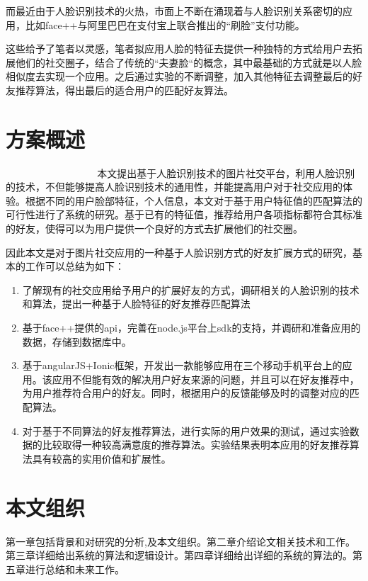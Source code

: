 而最近由于人脸识别技术的火热，市面上不断在涌现着与人脸识别关系密切的应用，比如face++与阿里巴巴在支付宝上联合推出的“刷脸”支付功能。

这些给予了笔者以灵感，笔者拟应用人脸的特征去提供一种独特的方式给用户去拓展他们的社交圈子，结合了传统的“夫妻脸“的概念，其中最基础的方式就是以人脸相似度去实现一个应用。之后通过实验的不断调整，加入其他特征去调整最后的好友推荐算法，得出最后的适合用户的匹配好友算法。
\section{方案概述}
􏰉􏴳􏰭􏴴􏴵􏴶􏴷􏰿􏴸􏴹􏴘􏰏􏲦􏲜􏱲􏴺􏰭􏴻􏲆􏴻􏴼􏰏􏱦􏴷􏱜􏰒􏴽􏳯􏴾􏴿􏵀􏱾􏱜本文提出基于人脸识别技术的图片社交平台，利用人脸识别的技术，不但能够提高人脸识别技术的通用性，并能提高用户对于社交应用的体验。根据不同的用户脸部特征，个人信息，本文对于基于用户特征值的匹配算法的可行性进行了系统的研究。基于已有的特征值，推荐给用户各项指标都符合其标准的好友，使得可以为用户提供一个良好的方式去扩展他们的社交圈。


因此本文是对于图片社交应用的一种基于人脸识别方式的好友扩展方式的研究，基本的工作可以总结为如下：
\begin{enumerate}
\item 了解现有的社交应用给予用户的扩展好友的方式，调研相关的人脸识别的技术和算法，提出一种基于人脸特征的好友推荐匹配算法
\item 基于face++提供的api，完善在node.js平台上sdk的支持，并调研和准备应用的数据，存储到数据库中。
\item 基于angularJS+Ionic框架，开发出一款能够应用在三个移动手机平台上的应用。该应用不但能有效的解决用户好友来源的问题，并且可以在好友推荐中，为用户推荐符合用户的好友。同时，根据用户的反馈能够及时的调整对应的匹配算法。
\item 对于基于不同算法的好友推荐算法，进行实际的用户效果的测试，通过实验数据的比较取得一种较高满意度的推荐算法。实验结果表明本应用的好友推荐算法具有较高的实用价值和扩展性。
\end{enumerate}

\section{本文组织}
第一章包括背景和对研究的分析,及本文组织。第二章介绍论文相关技术和工作。第三章详细给出系统的算法和逻辑设计。第四章详细给出详细的系统的算法的。第五章进行总结和未来工作。

